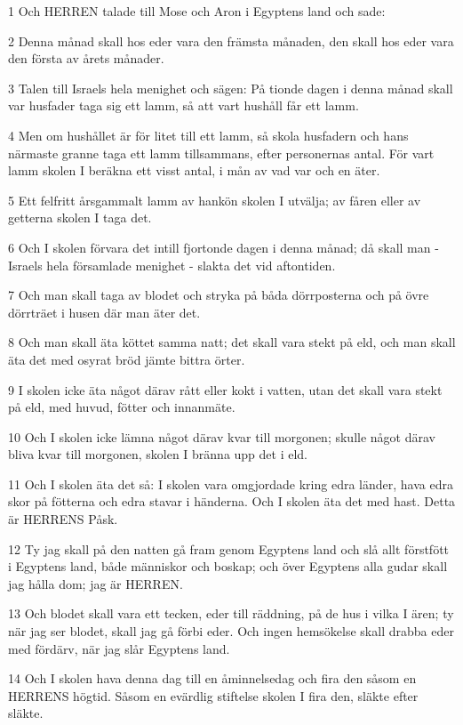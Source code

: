 \par 1 Och HERREN talade till Mose och Aron i Egyptens land och sade:
\par 2 Denna månad skall hos eder vara den främsta månaden, den skall hos eder vara den första av årets månader.
\par 3 Talen till Israels hela menighet och sägen: På tionde dagen i denna månad skall var husfader taga sig ett lamm, så att vart hushåll får ett lamm.
\par 4 Men om hushållet är för litet till ett lamm, så skola husfadern och hans närmaste granne taga ett lamm tillsammans, efter personernas antal. För vart lamm skolen I beräkna ett visst antal, i mån av vad var och en äter.
\par 5 Ett felfritt årsgammalt lamm av hankön skolen I utvälja; av fåren eller av getterna skolen I taga det.
\par 6 Och I skolen förvara det intill fjortonde dagen i denna månad; då skall man - Israels hela församlade menighet - slakta det vid aftontiden.
\par 7 Och man skall taga av blodet och stryka på båda dörrposterna och på övre dörrträet i husen där man äter det.
\par 8 Och man skall äta köttet samma natt; det skall vara stekt på eld, och man skall äta det med osyrat bröd jämte bittra örter.
\par 9 I skolen icke äta något därav rått eller kokt i vatten, utan det skall vara stekt på eld, med huvud, fötter och innanmäte.
\par 10 Och I skolen icke lämna något därav kvar till morgonen; skulle något därav bliva kvar till morgonen, skolen I bränna upp det i eld.
\par 11 Och I skolen äta det så: I skolen vara omgjordade kring edra länder, hava edra skor på fötterna och edra stavar i händerna. Och I skolen äta det med hast. Detta är HERRENS Påsk.
\par 12 Ty jag skall på den natten gå fram genom Egyptens land och slå allt förstfött i Egyptens land, både människor och boskap; och över Egyptens alla gudar skall jag hålla dom; jag är HERREN.
\par 13 Och blodet skall vara ett tecken, eder till räddning, på de hus i vilka I ären; ty när jag ser blodet, skall jag gå förbi eder. Och ingen hemsökelse skall drabba eder med fördärv, när jag slår Egyptens land.
\par 14 Och I skolen hava denna dag till en åminnelsedag och fira den såsom en HERRENS högtid. Såsom en evärdlig stiftelse skolen I fira den, släkte efter släkte.
